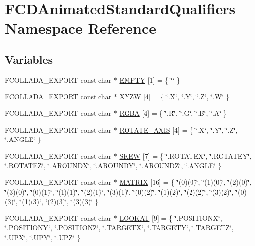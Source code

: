 \hypertarget{namespaceFCDAnimatedStandardQualifiers}{
\section{FCDAnimatedStandardQualifiers Namespace Reference}
\label{namespaceFCDAnimatedStandardQualifiers}
}
\subsection*{Variables}
\begin{DoxyCompactItemize}
\item 
FCOLLADA\_\-EXPORT const char $\ast$ \hyperlink{namespaceFCDAnimatedStandardQualifiers_ab358332d229e064dcf23d78f790f5d8d}{EMPTY} \mbox{[}1\mbox{]} = \{ \char`\"{}\char`\"{} \}
\item 
FCOLLADA\_\-EXPORT const char $\ast$ \hyperlink{namespaceFCDAnimatedStandardQualifiers_a05e7e8fa7a544c64eb06eb390e856145}{XYZW} \mbox{[}4\mbox{]} = \{ \char`\"{}.X\char`\"{}, \char`\"{}.Y\char`\"{}, \char`\"{}.Z\char`\"{}, \char`\"{}.W\char`\"{} \}
\item 
FCOLLADA\_\-EXPORT const char $\ast$ \hyperlink{namespaceFCDAnimatedStandardQualifiers_ab52f470388beb5e2e143950fa66650d1}{RGBA} \mbox{[}4\mbox{]} = \{ \char`\"{}.R\char`\"{}, \char`\"{}.G\char`\"{}, \char`\"{}.B\char`\"{}, \char`\"{}.A\char`\"{} \}
\item 
FCOLLADA\_\-EXPORT const char $\ast$ \hyperlink{namespaceFCDAnimatedStandardQualifiers_a3daffe3d91ba79acbfdcd2571d09a819}{ROTATE\_\-AXIS} \mbox{[}4\mbox{]} = \{ \char`\"{}.X\char`\"{}, \char`\"{}.Y\char`\"{}, \char`\"{}.Z\char`\"{}, \char`\"{}.ANGLE\char`\"{} \}
\item 
FCOLLADA\_\-EXPORT const char $\ast$ \hyperlink{namespaceFCDAnimatedStandardQualifiers_a8022c3d11024cfe71bb0d07f3e7dbc55}{SKEW} \mbox{[}7\mbox{]} = \{ \char`\"{}.ROTATEX\char`\"{}, \char`\"{}.ROTATEY\char`\"{}, \char`\"{}.ROTATEZ\char`\"{}, \char`\"{}.AROUNDX\char`\"{}, \char`\"{}.AROUNDY\char`\"{}, \char`\"{}.AROUNDZ\char`\"{}, \char`\"{}.ANGLE\char`\"{} \}
\item 
FCOLLADA\_\-EXPORT const char $\ast$ \hyperlink{namespaceFCDAnimatedStandardQualifiers_a326b2afcd7eb67b2cb9b9b7c255ecd7f}{MATRIX} \mbox{[}16\mbox{]} = \{ \char`\"{}(0)(0)\char`\"{}, \char`\"{}(1)(0)\char`\"{}, \char`\"{}(2)(0)\char`\"{}, \char`\"{}(3)(0)\char`\"{}, \char`\"{}(0)(1)\char`\"{}, \char`\"{}(1)(1)\char`\"{}, \char`\"{}(2)(1)\char`\"{}, \char`\"{}(3)(1)\char`\"{}, \char`\"{}(0)(2)\char`\"{}, \char`\"{}(1)(2)\char`\"{}, \char`\"{}(2)(2)\char`\"{}, \char`\"{}(3)(2)\char`\"{}, \char`\"{}(0)(3)\char`\"{}, \char`\"{}(1)(3)\char`\"{}, \char`\"{}(2)(3)\char`\"{}, \char`\"{}(3)(3)\char`\"{} \}
\item 
FCOLLADA\_\-EXPORT const char $\ast$ \hyperlink{namespaceFCDAnimatedStandardQualifiers_a7f1f279f434275d7e9ddcb4dc4bb9822}{LOOKAT} \mbox{[}9\mbox{]} = \{ \char`\"{}.POSITIONX\char`\"{}, \char`\"{}.POSITIONY\char`\"{}, \char`\"{}.POSITIONZ\char`\"{}, \char`\"{}.TARGETX\char`\"{}, \char`\"{}.TARGETY\char`\"{}, \char`\"{}.TARGETZ\char`\"{}, \char`\"{}.UPX\char`\"{}, \char`\"{}.UPY\char`\"{}, \char`\"{}.UPZ\char`\"{} \}
\end{DoxyCompactItemize}


